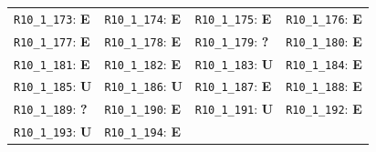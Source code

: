 \begin{longtable}{llll}
\texttt{R10\_1\_173}: \textbf{E} & \texttt{R10\_1\_174}: \textbf{E} & \texttt{R10\_1\_175}: \textbf{E} & \texttt{R10\_1\_176}: \textbf{E} \\
\texttt{R10\_1\_177}: \textbf{E} & \texttt{R10\_1\_178}: \textbf{E} & \texttt{R10\_1\_179}: \textbf{?} & \texttt{R10\_1\_180}: \textbf{E} \\
\texttt{R10\_1\_181}: \textbf{E} & \texttt{R10\_1\_182}: \textbf{E} & \texttt{R10\_1\_183}: \textbf{U} & \texttt{R10\_1\_184}: \textbf{E} \\
\texttt{R10\_1\_185}: \textbf{U} & \texttt{R10\_1\_186}: \textbf{U} & \texttt{R10\_1\_187}: \textbf{E} & \texttt{R10\_1\_188}: \textbf{E} \\
\texttt{R10\_1\_189}: \textbf{?} & \texttt{R10\_1\_190}: \textbf{E} & \texttt{R10\_1\_191}: \textbf{U} & \texttt{R10\_1\_192}: \textbf{E} \\
\texttt{R10\_1\_193}: \textbf{U} & \texttt{R10\_1\_194}: \textbf{E} &  &  \\
\bottomrule
\end{longtable}
